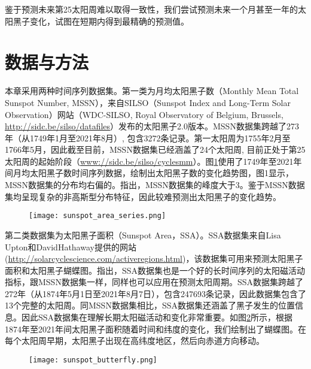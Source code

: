 鉴于预测未来第25太阳周难以取得一致性，我们尝试预测未来一个月甚至一年的太阳黑子变化，试图在短期内得到最精确的预测值。

\section{数据与方法}\label{sec:ss_result}

本章采用两种时间序列数据集。第一类为月均太阳黑子数（Monthly Mean Total Sunspot Number, MSSN），来自SILSO（Sunspot Index and Long-Term Solar Observation）网站（WDC-SILSO, Royal Observatory of Belgium, Brussels, \href{http://sidc.be/silso/datafiles}{http://sidc.be/silso/datafiles}）发布的太阳黑子2.0版本。MSSN数据集跨越了273年（从1749年1月至2021年8月）, 包含3272条记录。第一太阳周为1755年2月至1766年5月，因此截至目前，MSSN数据集已经涵盖了24个太阳周, 目前正处于第25太阳周的起始阶段（\href{www://sidc.be/silso/cyclesmm}{www://sidc.be/silso/cyclesmm}）。图\ref{fig:sunspot_area_series}使用了1749年至2021年间月均太阳黑子数时间序列数据，绘制出太阳黑子数的变化趋势图，图1显示，MSSN数据集的分布均右偏的。\citet{panigrahi2021forecasting}指出，MSSN数据集的峰度大于3。鉴于MSSN数据集均呈现复杂的非高斯型分布特征，因此较难预测出太阳黑子的变化趋势。

\begin{figure}[!htbp]
  \centering
  \texttt{[image: sunspot\_area\_series.png]}
  \vspace{-1cm}
  \label{fig:sunspot_area_series}
\end{figure}

第二类数据集为太阳黑子面积（Sunspot Area，SSA）。SSA数据集来自Lisa Upton和DavidHathaway提供的网站(\href{http://solarcyclescience.com/activeregions.html}{http://solarcyclescience.com/activeregions.html})，该数据集可用来预测太阳黑子面积和太阳黑子蝴蝶图。\citet{hathaway2015solar}指出，SSA数据集也是一个好的长时间序列的太阳磁活动指标，跟MSSN数据集一样，同样也可以应用在预测太阳周期。SSA数据集跨越了272年（从1874年5月1日至2021年8月7日），包含247693条记录，因此数据集包含了13个完整的太阳周。同MSSN数据集相比，SSA数据集还涵盖了黑子发生的位置信息。因此SSA数据集在理解长期太阳磁活动和变化非常重要。如图\ref{fig:sunspot_butterfly}所示，根据1874年至2021年间太阳黑子面积随着时间和纬度的变化，我们绘制出了蝴蝶图。在每个太阳周早期，太阳黑子出现在高纬度地区，然后向赤道方向移动。

\begin{figure}[!htbp]
  \centering
  \texttt{[image: sunspot\_butterfly.png]}
  \vspace{-1cm}
  \label{fig:sunspot_butterfly}
\end{figure}

